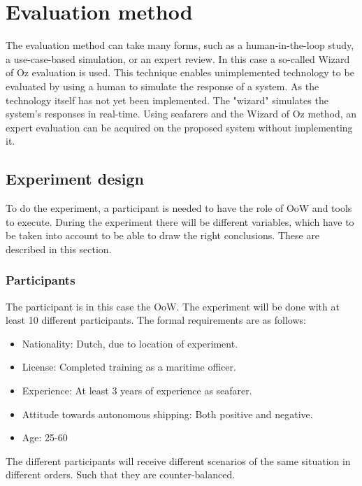 
\section{Evaluation method}
The evaluation method can take many forms, such as a human-in-the-loop study, a use-case-based simulation, or an expert review. In this case a so-called Wizard of Oz evaluation is used. This technique enables unimplemented technology to be evaluated by using a human to simulate the response of a system. As the technology itself has not yet been implemented. The "wizard" simulates the system's responses in real-time. Using seafarers and the Wizard of Oz method, an expert evaluation can be acquired on the proposed system without implementing it.

\subsection{Experiment design}
To do the experiment, a participant is needed to have the role of \acf{OoW} and tools to execute. During the experiment there will be different variables, which have to be taken into account to be able to draw the right conclusions. These are described in this section.

\subsubsection{Participants}
The participant is in this case the \acf{OoW}. The experiment will be done with at least 10 different participants. The formal requirements are as follows:
\begin{itemize}
	\item Nationality: Dutch, due to location of experiment.
	\item License: Completed training as a maritime officer.
	\item Experience: At least 3 years of experience as seafarer.
	\item Attitude towards autonomous shipping: Both positive and negative.
	\item Age: 25-60
\end{itemize}
The different participants will receive different scenarios of the same situation in different orders. Such that they are counter-balanced.

